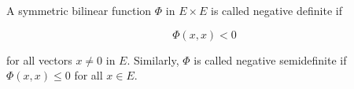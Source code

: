 A symmetric bilinear function $\Phi$ in $E \times E$ is called negative definite if

$$\Phi(x, x) < 0$$

for all vectors $x \neq 0$ in $E$. Similarly, $\Phi$ is called negative semidefinite if $\Phi(x, x) \leq 0$ for all $x \in E$.
